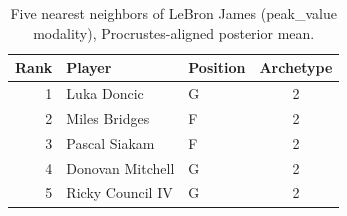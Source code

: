 \begin{table}[htbp]
  \centering\small
  \begin{tabular}{rllc}
    \toprule
    Rank & Player & Position & Archetype \\
    \midrule
    1 & Luka Doncic & G & 2 \\
    2 & Miles Bridges & F & 2 \\
    3 & Pascal Siakam & F & 2 \\
    4 & Donovan Mitchell & G & 2 \\
    5 & Ricky Council IV & G & 2 \\
    \bottomrule
  \end{tabular}
  \caption{Five nearest neighbors of LeBron James (peak_value modality), Procrustes-aligned posterior mean.}
  \label{tab:LeBron_James_neighbors_peak_value}
\end{table}

